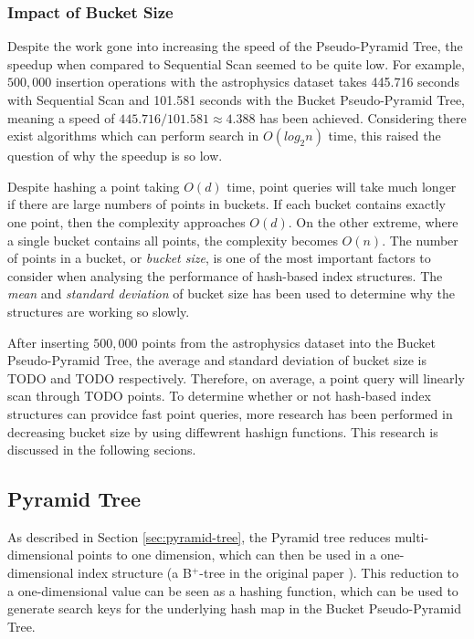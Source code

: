 \subsubsection{Impact of Bucket Size}

Despite the work gone into increasing the speed of the Pseudo-Pyramid Tree, the speedup when compared to Sequential Scan seemed to be quite low. For example, $500,000$ insertion operations with the astrophysics dataset takes 445.716 seconds with Sequential Scan and 101.581 seconds with the Bucket Pseudo-Pyramid Tree, meaning a speed of $445.716/101.581 \approx 4.388$ has been achieved. Considering there exist algorithms which can perform search in $O(log_2 n)$ time, this raised the question of why the speedup is so low.

Despite hashing a point taking $O(d)$ time, point queries will take much longer if there are large numbers of points in buckets. If each bucket contains exactly one point, then the complexity approaches $O(d)$. On the other extreme, where a single bucket contains all points, the complexity becomes $O(n)$. The number of points in a bucket, or \textit{bucket size}, is one of the most important factors to consider when analysing the performance of hash-based index structures. The \textit{mean} and \textit{standard deviation} of bucket size has been used to determine why the structures are working so slowly.

After inserting $500,000$ points from the astrophysics dataset into the Bucket Pseudo-Pyramid Tree, the average and standard deviation of bucket size is TODO and TODO respectively. Therefore, on average, a point query will linearly scan through TODO points. To determine whether or not hash-based index structures can providce fast point queries, more research has been performed in decreasing bucket size by using diffewrent hashign functions. This research is discussed in the following secions.

\subsection{Pyramid Tree}

As described in Section \ref{sec:pyramid-tree}, the Pyramid tree reduces multi-dimensional points to one dimension, which can then be used in a one-dimensional index structure (a B${}^{+}$-tree in the original paper \cite{pyramid-tree}). This reduction to a one-dimensional value can be seen as a hashing function, which can be used to generate search keys for the underlying hash map in the Bucket Pseudo-Pyramid Tree.

